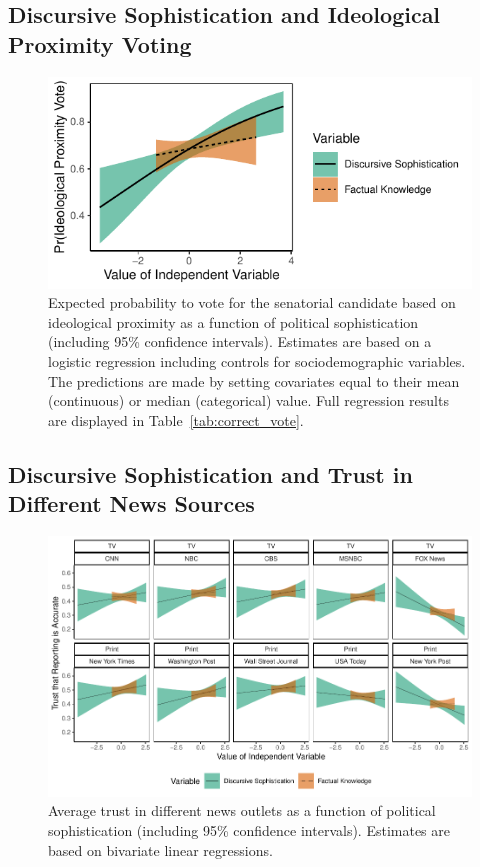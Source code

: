 \clearpage
\subsection{Discursive Sophistication and Ideological Proximity Voting}\label{app:proximity}

\begin{figure}[h]\centering
	\includegraphics{../fig/correct_vote.pdf}
	\caption{Expected probability to vote for the senatorial candidate based on ideological proximity as a function of political sophistication (including 95\% confidence intervals). Estimates are based on a logistic regression including controls for sociodemographic variables. The predictions are made by setting covariates equal to their mean (continuous) or median (categorical) value. Full regression results are displayed in Table~\ref{tab:correct_vote}.}\label{fig:correct_vote}
\end{figure}



\clearpage
\subsection{Discursive Sophistication and Trust in Different News Sources}\label{app:media}

\begin{figure}[h]\centering
	\includegraphics{../fig/media_trust.pdf}
	\caption{Average trust in different news outlets as a function of political sophistication (including 95\% confidence intervals). Estimates are based on bivariate linear regressions.}\label{fig:media_trust}
\end{figure}

